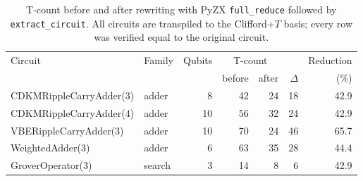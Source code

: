 \begin{table}[t]
  \centering
  \caption{T-count before and after rewriting with PyZX \texttt{full\_reduce} followed by \texttt{extract\_circuit}. All circuits are transpiled to the Clifford+$T$ basis; every row was verified equal to the original circuit.}
  \label{tab:tcount}
  \small
  \begin{tabular}{llrrrrr}
    \toprule
    Circuit & Family & Qubits & \multicolumn{2}{c}{T-count} & & Reduction \\
            &        &        & before & after & $\Delta$ & (\%) \\
    \midrule
    CDKMRippleCarryAdder(3) & adder & 8 & 42 & 24 & 18 & 42.9 \\
    CDKMRippleCarryAdder(4) & adder & 10 & 56 & 32 & 24 & 42.9 \\
    VBERippleCarryAdder(3) & adder & 10 & 70 & 24 & 46 & 65.7 \\
    WeightedAdder(3) & adder & 6 & 63 & 35 & 28 & 44.4 \\
    GroverOperator(3) & search & 3 & 14 & 8 & 6 & 42.9 \\
    \bottomrule
  \end{tabular}
\end{table}
